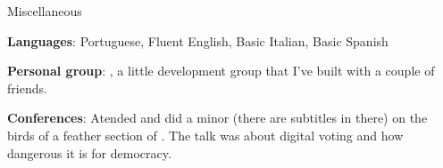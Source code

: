 \begin{rubric}{Miscellaneous} 

    \entry* \textbf{Languages}: Portuguese, Fluent English, Basic Italian, Basic
    Spanish

    \entry* \textbf{Personal group}: , a
    little development group that I've built with a couple of friends.

    \entry* \textbf{Conferences}: Atended and did a minor
    (there are subtitles in there) on the birds of a feather section of
    . The
    talk was about digital voting and how dangerous it is for democracy.
        
\end{rubric}
